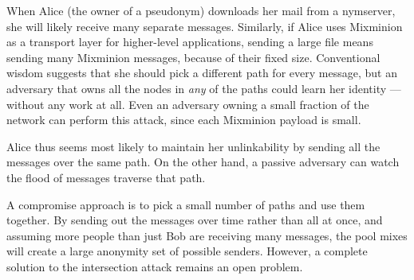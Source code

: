 \documentclass[times,10pt,twocolumn]{article}
\begin{document}
\label{subsec:many-messages}

When Alice (the owner of a pseudonym) downloads her mail from a
nymserver, she will likely receive many separate messages. Similarly, if
Alice uses Mixminion as a transport layer for higher-level applications,
sending a large file means sending many Mixminion messages, because of
their fixed size.
Conventional wisdom suggests that she should pick a different
path for every message, but an adversary that owns all the nodes in
\emph{any} of the paths could learn her identity --- without any work
at all. Even an adversary owning a small fraction of the network
can perform this attack, since each Mixminion payload is small.


Alice thus seems most likely to maintain her unlinkability by sending all
the messages over the same path. On the other hand, a passive adversary
can watch the flood of messages traverse that path.

A compromise approach is to pick a small number of paths and use them
together. By sending out the messages over time rather than all at once,
and assuming more people than just Bob are receiving many messages,
the pool mixes will create a large anonymity set of possible senders.
However, a complete solution to the intersection attack remains an
open problem.


\end{document}
